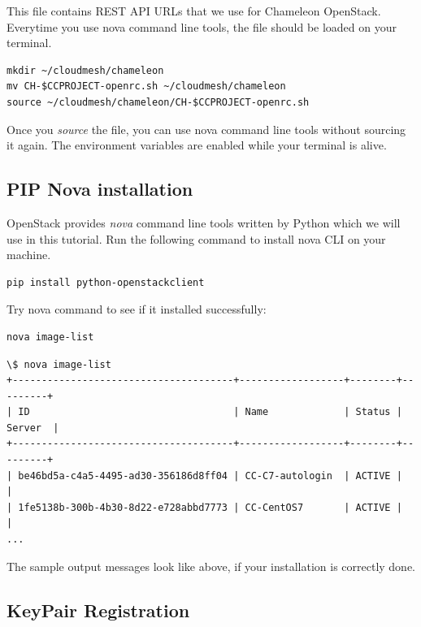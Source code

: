   This file contains REST API URLs that we use for Chameleon
  OpenStack.  Everytime you use nova command line tools, the file
  should be loaded on your terminal.






\begin{lstlisting}
mkdir ~/cloudmesh/chameleon
mv CH-$CCPROJECT-openrc.sh ~/cloudmesh/chameleon
source ~/cloudmesh/chameleon/CH-$CCPROJECT-openrc.sh
\end{lstlisting}

Once you \textit{source} the file, you can use nova command line tools
without sourcing it again.  The environment variables are enabled
while your terminal is alive.

\subsection{PIP Nova installation}

OpenStack provides \textit{nova} command line tools written by Python
which we will use in this tutorial. Run the following command to
install nova CLI on your machine.

\begin{lstlisting}
pip install python-openstackclient
\end{lstlisting}

Try nova command to see if it installed successfully:

\begin{lstlisting}
nova image-list
\end{lstlisting}

\begin{lstlisting}
\$ nova image-list
+--------------------------------------+------------------+--------+---------+
| ID                                   | Name             | Status | Server  |
+--------------------------------------+------------------+--------+---------+
| be46bd5a-c4a5-4495-ad30-356186d8ff04 | CC-C7-autologin  | ACTIVE |         |
| 1fe5138b-300b-4b30-8d22-e728abbd7773 | CC-CentOS7       | ACTIVE |         |
...
\end{lstlisting}

The sample output messages look like above, if your installation is correctly
done.

\subsection{KeyPair Registration}

